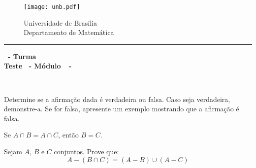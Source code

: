 \documentclass[12pt]{exam}
\begin{document}
    \begin{figure}[h]
        \begin{minipage}[c]{1.7cm}
            \texttt{[image: unb.pdf]}
        \end{minipage}
        \hspace{0pt}
        \begin{minipage}[c]{4in}
            {Universidade de Brasília} \\
            {Departamento de Matemática}
        \end{minipage}
    \end{figure}
    \hrule
    \begin{center}
        {\Large\bf \disciplina\ - Turma \turma}  \\
         {\large\bf Teste \numeroteste\ - Módulo\ \modulo\ -\ \dataavaliacao}
    \end{center}

    \\
    \vspace*{.01cm}

    \vspace{.4cm}

    \questao{} Determine se a afirmação dada é verdadeira ou falsa. Caso seja verdadeira, demonstre-a. Se for falsa, apresente um exemplo mostrando que a afirmação é falsa.
    \begin{center}
        Se $A \cap B = A \cap C$, então $B = C$.
    \end{center}
    \vspace*{.5cm}
    \questao{} Sejam $A$, $B$ e $C$ conjuntos. Prove que:
    \[
        A - (B \cap C) = (A - B) \cup (A - C)
    \]
\end{document}
